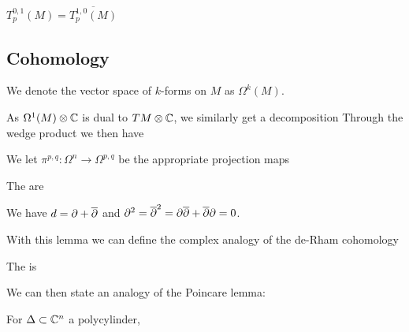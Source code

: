 \documentclass{article}
\begin{document}
\begin{lemma}
	$T^{0,1}_p(M) = \overline{T^{1,0}_p(M)}$
\end{lemma}
\subsection{Cohomology}

\begin{notation}
	We denote the vector space of $k$-forms on $M$ as $\Omega^k(M)$. 
\end{notation}

As $\Omega^1(M)\otimes \mathbb{C}$ is dual to $TM\otimes \mathbb{C}$, we similarly get a decomposition
Through the wedge product we then have 
\begin{notation}
	We let $\pi^{p,q}:\Omega^n \to \Omega^{p,q}$ be the appropriate projection maps 
\end{notation}

\begin{definition}
	The  are 
\end{definition}

\begin{lemma}
	We have $d = \partial + \overline{\partial}$ and $\partial^2 = \overline{\partial}^2 = \partial \overline{\partial} + \overline{\partial} \partial = 0$.
\end{lemma}

With this lemma we can define the complex analogy of the de-Rham cohomology

\begin{definition}
	The  is 
\end{definition}

We can then state an analogy of the Poincare lemma:

\begin{prop}
	For $\Delta\subset \mathbb{C}^n$ a polycylinder, 
\end{prop}
\end{document}
